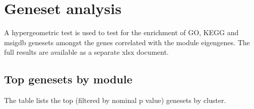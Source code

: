 \section{Geneset analysis}

A hypergeometric test is used to test for the enrichment of GO, KEGG and msigdb genesets amongst the genes correlated with the module eigengenes. The full results
are available as a separate xlsx document.



\clearpage

\subsection{Top genesets by module}

The table lists the top (filtered by nominal p value) genesets by cluster.



\clearpage
